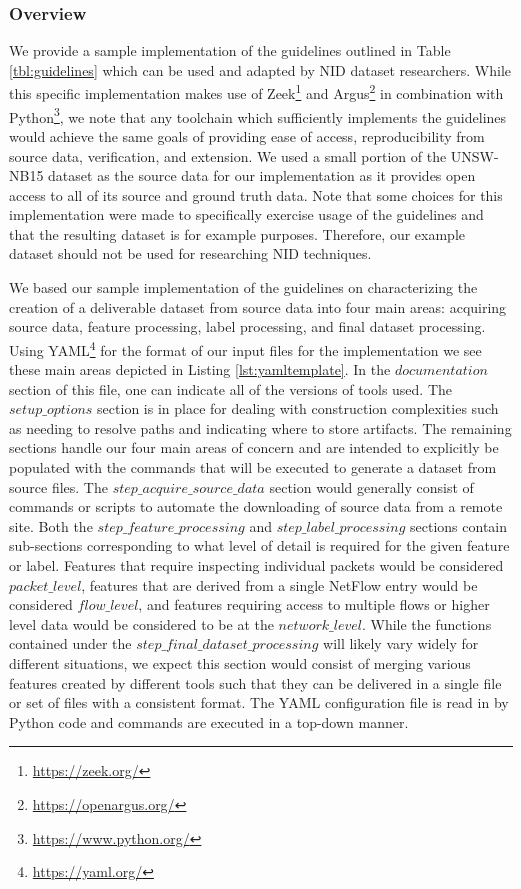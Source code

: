 \documentclass[sigconf, anonymous, screen]{acmart}
\begin{document}
\subsubsection{Overview}\label{subsubsec:sample_overview}
We provide a sample implementation of the guidelines outlined in Table \ref{tbl:guidelines} which can be used and adapted by NID dataset researchers.
While this specific implementation makes use of Zeek\footnote{\url{https://zeek.org/}} and Argus\footnote{\url{https://openargus.org/}} in combination with Python\footnote{\url{https://www.python.org/}}, we note that any toolchain which sufficiently implements the guidelines would achieve the same goals of providing ease of access, reproducibility from source data, verification, and extension.
We used a small portion of the UNSW-NB15 dataset \cite{unswnb15} as the source data for our implementation as it provides open access to all of its source and ground truth data.
Note that some choices for this implementation were made to specifically exercise usage of the guidelines and that the resulting dataset is for example purposes.
Therefore, our example dataset should not be used for researching NID techniques.

We based our sample implementation of the guidelines on characterizing the creation of a deliverable dataset from source data into four main areas:  acquiring source data, feature processing, label processing, and final dataset processing.
Using YAML\footnote{\url{https://yaml.org/}} for the format of our input files for the implementation we see these main areas depicted in Listing \ref{lst:yamltemplate}.
In the $documentation$ section of this file, one can indicate all of the versions of tools used.
The $setup\_options$ section is in place for dealing with construction complexities such as needing to resolve paths and indicating where to store artifacts.
The remaining sections handle our four main areas of concern and are intended to explicitly be populated with the commands that will be executed to generate a dataset from source files.
The $step\_acquire\_source\_data$ section would generally consist of commands or scripts to automate the downloading of source data from a remote site.
Both the $step\_feature\_processing$ and $step\_label\_processing$ sections contain sub-sections corresponding to what level of detail is required for the given feature or label.
Features that require inspecting individual packets would be considered $packet\_level$, features that are derived from a single NetFlow entry would be considered $flow\_level$, and features requiring access to multiple flows or higher level data would be considered to be at the $network\_level$.
While the functions contained under the $step\_final\_dataset\_processing$ will likely vary widely for different situations, we expect this section would consist of merging various features created by different tools such that they can be delivered in a single file or set of files with a consistent format.
The YAML configuration file is read in by Python code and commands are executed in a top-down manner.
\end{document}
